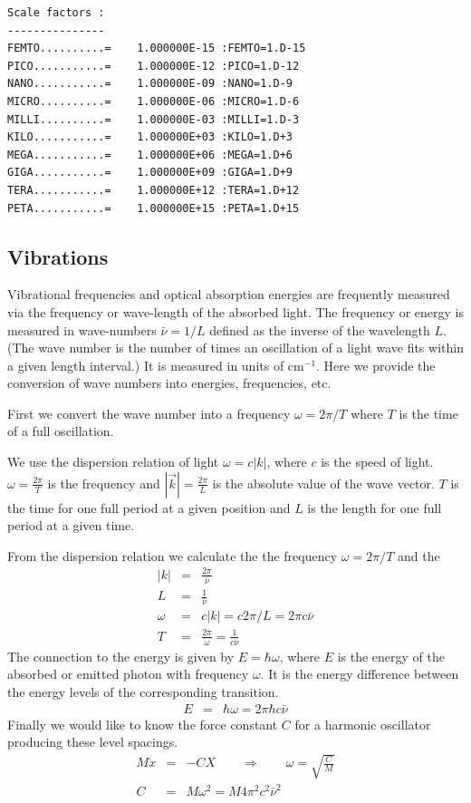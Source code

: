\documentclass[final,12pt,makeidx,DIV=calc]{article}
\begin{document}
{{{{{{\begin{verbatim}
Scale factors :
---------------
FEMTO..........=    1.000000E-15 :FEMTO=1.D-15
PICO...........=    1.000000E-12 :PICO=1.D-12
NANO...........=    1.000000E-09 :NANO=1.D-9
MICRO..........=    1.000000E-06 :MICRO=1.D-6
MILLI..........=    1.000000E-03 :MILLI=1.D-3
KILO...........=    1.000000E+03 :KILO=1.D+3
MEGA...........=    1.000000E+06 :MEGA=1.D+6
GIGA...........=    1.000000E+09 :GIGA=1.D+9
TERA...........=    1.000000E+12 :TERA=1.D+12
PETA...........=    1.000000E+15 :PETA=1.D+15
\end{verbatim}

\newpage
\subsection{Vibrations}

Vibrational frequencies and optical absorption energies are frequently
measured via the frequency or wave-length of the absorbed light. The
frequency or energy is measured in wave-numbers $\bar{\nu}=1/L$
defined as the inverse of the wavelength $L$. (The wave number is the
number of times an oscillation of a light wave fits within a given
length interval.) It is measured in units of cm$^{-1}$. Here we
provide the conversion of wave numbers into energies, frequencies,
etc.


First we convert the wave number into a frequency $\omega=2\pi/T$ where $T$ is
the time of a full oscillation. 

We use the dispersion relation of light $\omega=c|k|$, where $c$ is the speed
of light. $\omega=\frac{2\pi}{T}$ is the frequency and
$|\vec{k}|=\frac{2\pi}{L}$ is the absolute value of the wave vector. $T$ is the
time for one full period at a given position and $L$ is the length for one
full period at a given time.

From the dispersion relation we calculate the 
the frequency $\omega=2\pi/T$ and the 
\begin{eqnarray}
|k|&=&\frac{2\pi}{\bar{\nu}}
\label{eq:kofbarnu}
\\
L&=&\frac{1}{\bar{\nu}}
\label{eq:wavelengthofbarnu}
\\
\omega&=&c|k|=c2\pi/L=2\pi c\bar{\nu}
\label{eq:omegaofbarnu}
\\
T&=&\frac{2\pi}{\omega}=\frac{1}{c\bar{\nu}}
\label{eq:periodofbarnu}
\end{eqnarray}
The connection to the energy is given by $E=\hbar\omega$, where $E$ is the
energy of the absorbed or emitted photon with frequency $\omega$. It is the
energy difference between the energy levels of the corresponding transition.
\begin{eqnarray}
E&=&\hbar\omega=2\pi\hbar c\bar{\nu}
\label{eq:eofomega}
\end{eqnarray}
Finally we would like to know the force constant $C$ for a harmonic oscillator
producing these level spacings. 
\begin{eqnarray}
M\ddot{x}&=&-CX
\qquad\Rightarrow\qquad \omega= \sqrt{\frac{C}{M}}
\nonumber\\
C&=&M\omega^2=M4\pi^2c^2\bar{\nu}^2
\end{eqnarray}

}}}}}}
\end{document}
